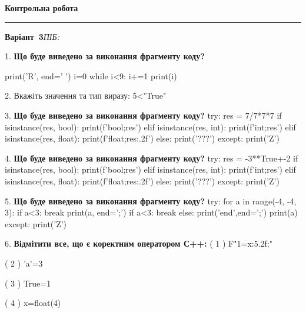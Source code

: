 \documentclass[11pt]{article}
\begin{document}
{\centering\Large\bfseries Контрольна робота\par}
\medskip
\noindent\rule{\linewidth}{0.5pt}
\smallskip
\noindent\textbf{Варіант \No\,3}\hfill \textit{ПІБ:}\,\underline{\hspace{60mm}}
\vspace{4mm}

1. \textbf{Що буде виведено за виконання фрагменту коду?}

print('R', end=' ')
i=0
while i<9:
    i+=1
print(i)

\vspace{5mm}

2. 
Вкажіть значення та тип виразу:
5<"True"
\vspace{5mm}

3. \textbf{Що буде виведено за виконання фрагменту коду?}
try:
    res = 7/7*7*7
    if isinstance(res, bool):
        print(f'bool;{res}')
    elif isinstance(res, int):
        print(f'int;{res}')
    elif isinstance(res, float):
        print(f'float;{res:.2f}')
    else:
        print('???')
except:
    print('Z')
\vspace{5mm}

4. \textbf{Що буде виведено за виконання фрагменту коду?}
try:
    res = -3**True+-2
    if isinstance(res, bool):
        print(f'bool;{res}')
    elif isinstance(res, int):
        print(f'int;{res}')
    elif isinstance(res, float):
        print(f'float;{res:.2f}')
    else:
        print('???')
except:
    print('Z')
\vspace{5mm}

5. \textbf{Що буде виведено за виконання фрагменту коду?}
try:
    for a in range(-4, -4, 3):
        if a<3:
            break
        print(a, end=';')
        if a<3:
            break
    else:
        print('end',end=';')
    print(a)
except:
    print('Z')
\vspace{5mm}

6. %
\textbf{Відмітити все, що є коректним оператором С++:}
( 1 ) F"1={x:5.2f};"

( 2 ) 'a'=3

( 3 ) True=1

( 4 ) x=float(4)
\vspace{5mm}
\end{document}
